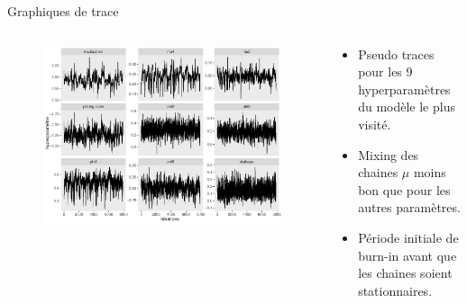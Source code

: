 \documentclass[aspectratio=169]{beamer}
\begin{document}
\begin{frame}{Graphiques de trace}
\begin{columns}
	\begin{column}{0.65\textwidth}
		\begin{figure}
		\vspace{-0.4cm}
	 		\includegraphics[height=0.88\textheight, center]{../figures/traces.pdf}
		\end{figure}
	\end{column}
	\begin{column}{0.35\textwidth}
    	\begin{itemize}
	\setlength{\itemsep}{10pt}
	\item Pseudo traces pour les 9 hyperparamètres du modèle le plus visité.
	\item Mixing des chaines $\mu$ moins bon que pour les autres paramètres.
	\item Période initiale de burn-in avant que les chaines soient stationnaires.
	\end{itemize}
	\end{column}
\end{columns}
\end{frame}
\end{document}
